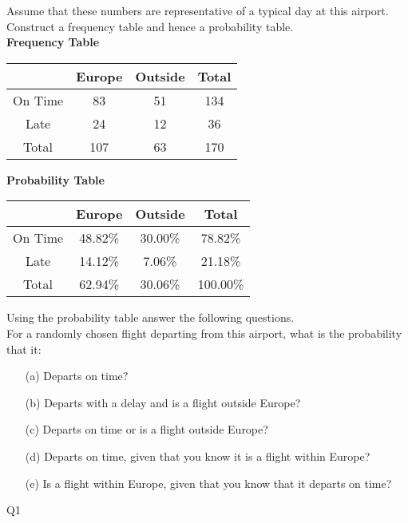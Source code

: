 \documentclass[]{report}
\begin{document}
\begin{enumerate}[(i)]
Assume that these numbers are representative of a typical 
day at this airport. Construct a frequency table and hence a probability table.\\ \bigskip
\textbf{Frequency Table}\\ \bigskip
\begin{tabular}{|c|c|c||c|}
	\hline  &  \phantom{sp} Europe \phantom{sp} & \phantom{sp} Outside \phantom{sp} &\phantom{sp} Total\phantom{sp}  \\ 
	\hline On Time  & 83 & 51 & 134 \\ 
	\hline Late & 24 & 12 & 36 \\ \hline
	\hline Total  & 107 & 63  & 170  \\ 
	\hline 
\end{tabular} 







\textbf{Probability Table} \\ \bigskip
\begin{tabular}{|c|c|c||c|}
	\hline  &  \phantom{sp} Europe \phantom{sp} & \phantom{sp} Outside \phantom{sp} & \phantom{sp} Total\phantom{sp}  \\ 
	\hline On Time  & 48.82\% & 30.00\% & 78.82\% \\ 
	\hline Late & 14.12\% & 7.06\% &  21.18\% \\ \hline
	\hline Total  & 62.94\% & 30.06\% & 100.00\% \\ 
	\hline 
\end{tabular} 



Using the probability table answer the following questions. \\
\bigskip
For a randomly chosen flight departing from this airport, what is the probability that it: 
\begin{itemize}
	\item[(a)] Departs on time? 
	\item[(b)] Departs with a delay and is a flight outside Europe? 
	
	\item[(c)] Departs on time or is a flight outside Europe? 
	\item[(d)] Departs on time, given that you know it is a flight within Europe? 
	
	\item[(e)] Is a flight within Europe, given that you know that it departs on time?
\end{itemize}
Q1


\end{enumerate}
\end{document}
